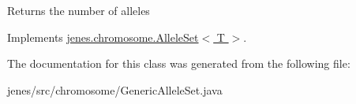 \begin{DoxyReturn}{Returns}
the number of alleles 
\end{DoxyReturn}


Implements \hyperlink{interfacejenes_1_1chromosome_1_1_allele_set_3_01_t_01_4_a3acbb10df92ebafc589d5d8546949f2f}{jenes.\-chromosome.\-Allele\-Set$<$ T $>$}.



The documentation for this class was generated from the following file\-:\begin{DoxyCompactItemize}
\item 
jenes/src/chromosome/Generic\-Allele\-Set.\-java\end{DoxyCompactItemize}

